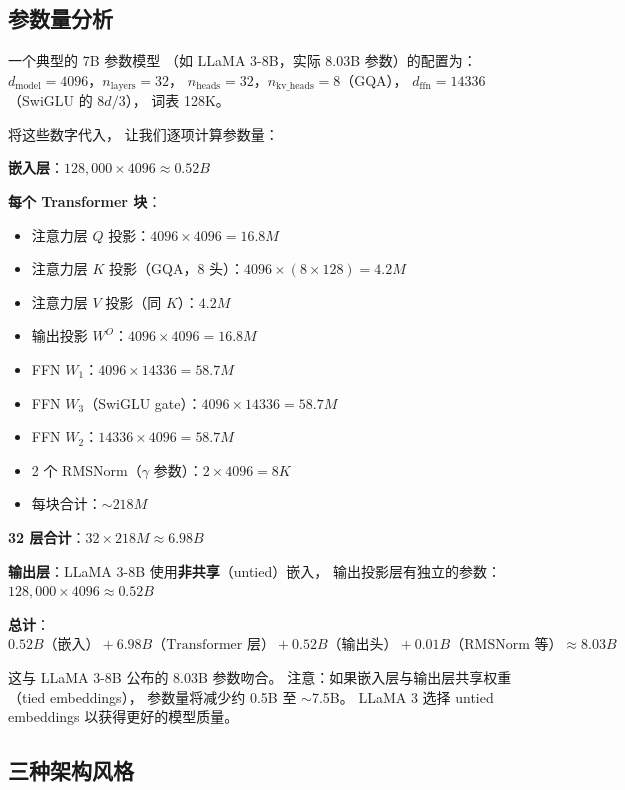 \subsection{参数量分析}

一个典型的 7B 参数模型
（如 LLaMA 3-8B，实际 8.03B 参数）的配置为：
$d_{\mathrm{model}} = 4096$，$n_{\mathrm{layers}} = 32$，
$n_{\mathrm{heads}} = 32$，$n_{\mathrm{kv\_heads}} = 8$（GQA），
$d_{\mathrm{ffn}} = 14336$（SwiGLU 的 $8d/3$），
词表 128K。

将这些数字代入，
让我们逐项计算参数量：

\textbf{嵌入层}：$128{,}000 \times 4096 \approx 0.52B$

\textbf{每个 Transformer 块}：
\begin{itemize}[noitemsep]
  \item 注意力层 $Q$ 投影：$4096 \times 4096 = 16.8M$
  \item 注意力层 $K$ 投影（GQA，8 头）：$4096 \times (8 \times 128) = 4.2M$
  \item 注意力层 $V$ 投影（同 $K$）：$4.2M$
  \item 输出投影 $W^O$：$4096 \times 4096 = 16.8M$
  \item FFN $W_1$：$4096 \times 14336 = 58.7M$
  \item FFN $W_3$（SwiGLU gate）：$4096 \times 14336 = 58.7M$
  \item FFN $W_2$：$14336 \times 4096 = 58.7M$
  \item 2 个 RMSNorm（$\gamma$ 参数）：$2 \times 4096 = 8K$
  \item 每块合计：$\sim 218M$
\end{itemize}

\textbf{32 层合计}：$32 \times 218M \approx 6.98B$

\textbf{输出层}：LLaMA 3-8B 使用\textbf{非共享}（untied）嵌入，
输出投影层有独立的参数：$128{,}000 \times 4096 \approx 0.52B$

\textbf{总计}：$0.52B\text{（嵌入）} + 6.98B\text{（Transformer 层）} + 0.52B\text{（输出头）} + 0.01B\text{（RMSNorm 等）} \approx 8.03B$

这与 LLaMA 3-8B 公布的 8.03B 参数吻合。
注意：如果嵌入层与输出层共享权重（tied embeddings），
参数量将减少约 0.5B 至 $\sim$7.5B。
LLaMA 3 选择 untied embeddings 以获得更好的模型质量。

\subsection{三种架构风格}

